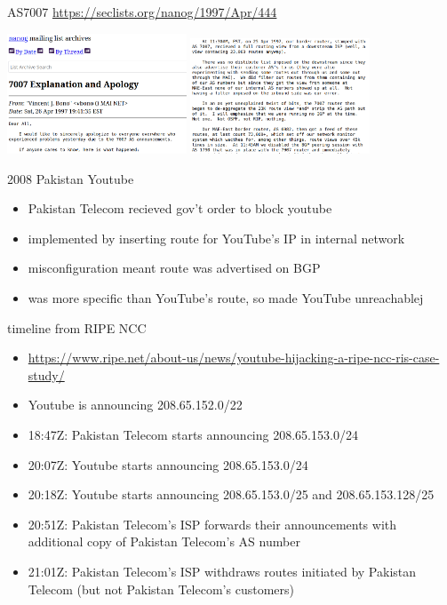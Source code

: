 
\begin{frame}{AS7007}
{\fontsize{8}{9}\selectfont\url{https://seclists.org/nanog/1997/Apr/444}}

\includegraphics[width=0.4\textwidth]{../routing/as7007-1.png}
\includegraphics[width=0.4\textwidth]{../routing/as7007-2.png}
\end{frame}

\begin{frame}{2008 Pakistan Youtube}
\begin{itemize}
\item Pakistan Telecom recieved gov't order to block youtube
\item implemented by inserting route for YouTube's IP in internal network
\vspace{.5cm}
\item misconfiguration meant route was advertised on BGP
\item was more specific than YouTube's route, so made YouTube unreachablej
\end{itemize}
\end{frame}

\begin{frame}{timeline from RIPE NCC}
\begin{itemize}
\item {\tiny \url{https://www.ripe.net/about-us/news/youtube-hijacking-a-ripe-ncc-ris-case-study/}}
\item Youtube is announcing 208.65.152.0/22
\item 18:47Z: Pakistan Telecom starts announcing 208.65.153.0/24
\item 20:07Z: Youtube starts announcing 208.65.153.0/24
\item 20:18Z: Youtube starts announcing 208.65.153.0/25 and 208.65.153.128/25
\item 20:51Z: Pakistan Telecom's ISP forwards their announcements with additional copy of Pakistan Telecom's AS number
\item 21:01Z: Pakistan Telecom's ISP withdraws routes initiated by Pakistan Telecom (but not Pakistan Telecom's customers)
\end{itemize}
\end{frame}

